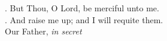 \begin{Parallel}[v]{\colw}{\colx}
{}
{\vern
{\noindent
\Vbar. But Thou, O Lord, be merciful unto me.\\
\Rbar. And raise me up; and I will requite them.\\
Our Father, \textit{in secret}}}

\end{Parallel}



